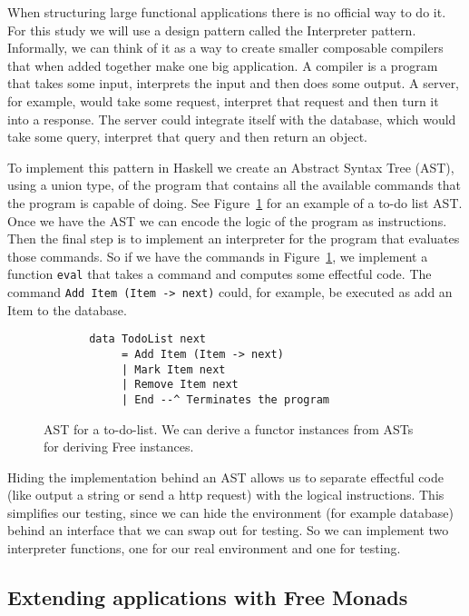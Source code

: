 \documentclass[12pt]{report}
\theoremstyle{definition}
\theoremstyle{theorem}
\begin{document}
When structuring large functional applications there is no official way to do
it. For this study we will use a design pattern called the Interpreter pattern.
Informally, we can think of it as a way to create smaller composable compilers
that when added together make one big application. A compiler is a program that
takes some input, interprets the input and then does some output. A server, for
example, would take some request, interpret that request and then turn it into a
response. The server could integrate itself with the database, which would take
some query, interpret that query and then return an
object.~\cite{interpreterpattern}

To implement this pattern in Haskell we create an Abstract Syntax Tree (AST),
using a union type, of the program that contains all the available commands that
the program is capable of doing. See Figure~\ref{freeunion} for an example of a
to-do list AST. Once we have the AST we can encode the logic of the program as
instructions. Then the final step is to implement an interpreter for the program
that evaluates those commands. So if we have the commands in
Figure~\ref{freeunion}, we implement a function \texttt{eval} that takes a
command and computes some effectful code. The command \texttt{Add Item (Item ->
next)} could, for example, be executed as add an Item to the database.

\begin{figure}[H]
    \begin{lstlisting}
       data TodoList next
            = Add Item (Item -> next)
            | Mark Item next
            | Remove Item next
            | End --^ Terminates the program
    \end{lstlisting}
    \label{freeunion}
    \caption{AST for a to-do-list. We can derive a functor instances
    from ASTs for deriving Free instances.~\cite{commentarycompiler}}
\end{figure}


Hiding the implementation behind an AST allows us to separate effectful code
(like output a string or send a http request) with the logical instructions.
This simplifies our testing, since we can hide the environment (for example
database) behind an interface that we can swap out for testing. So we can
implement two interpreter functions, one for our real environment and one for
testing. 

\subsection{Extending applications with Free Monads}
\end{document}

